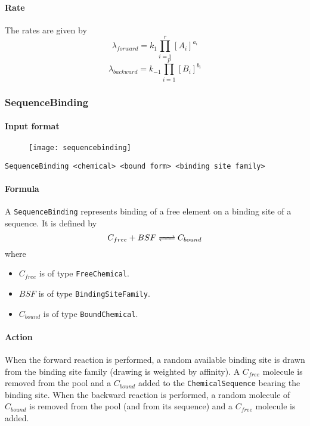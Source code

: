 \paragraph{Rate} The rates are given by
$$
	\lambda_{forward} = k_1 \prod\limits_{i=1}^{r} [A_i]^{a_i}
$$
$$
	\lambda_{backward} = k_{-1} \prod\limits_{i=1}^{p} [B_i]^{b_i}
$$

\subsubsection{SequenceBinding}
\paragraph{Input format}

\begin{figure}[!ht]
	\centering
	\texttt{[image: sequencebinding]}
\end{figure}

\begin{verbatim}
SequenceBinding <chemical> <bound form> <binding site family>
\end{verbatim}

\paragraph{Formula} A \texttt{SequenceBinding} represents binding of a free element on a binding site of a sequence. It is defined by
$$
	\reactionRev{C_{free} + BSF}{C_{bound}}{}{}
$$
where
\begin{itemize}
	\item $C_{free}$ is of type \texttt{FreeChemical}.
	\item $BSF$ is of type \texttt{BindingSiteFamily}.
	\item $C_{bound}$ is of type \texttt{BoundChemical}.
\end{itemize}

\paragraph{Action} When the forward reaction is performed, a random available binding site is drawn from the binding site family (drawing is weighted by affinity). A $C_{free}$ molecule is removed from the pool and a $C_{bound}$ added to the \texttt{ChemicalSequence} bearing the binding site. When the backward reaction is performed, a random molecule of $C_{bound}$ is removed from the pool (and from its sequence) and a $C_{free}$ molecule is added.

